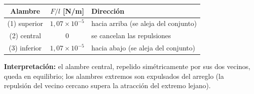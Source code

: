 \documentclass[12pt,letterpaper]{article}
\begin{document}
\begin{center}
\renewcommand{\arraystretch}{1.3}
\begin{tabular}{|c|c|l|}
\hline
\textbf{Alambre} & \textbf{$F/l$ [N/m]} & \textbf{Direcci\'on} \\
\hline
(1) superior & $1{,}07\times10^{-5}$ & hacia arriba (se aleja del conjunto) \\
(2) central  & $0$                   & se cancelan las repulsiones \\
(3) inferior & $1{,}07\times10^{-5}$ & hacia abajo (se aleja del conjunto) \\
\hline
\end{tabular}
\end{center}

\medskip
\noindent\textbf{Interpretaci\'on:} el alambre central, repelido sim\'etricamente por sus dos
vecinos, queda en equilibrio; los alambres extremos son expulsados del arreglo (la repulsi\'on del
vecino cercano supera la atracci\'on del extremo lejano).
\end{document}
